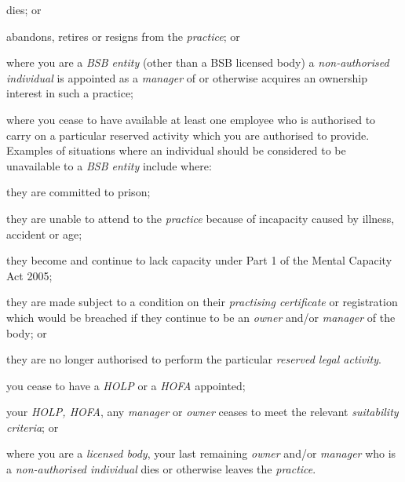 \al\item dies; or

\item abandons, retires or resigns from the \emph{practice}; or\la
\item where you are a \emph{BSB entity} (other than a BSB licensed body) a
\emph{non-authorised individual} is appointed as a \emph{manager} of or
otherwise acquires an ownership interest in such a practice;
\item where you cease to have available at least one employee who is
authorised to carry on a particular reserved activity which you are
authorised to provide. Examples of situations where an individual should
be considered to be unavailable to a \emph{BSB entity} include where:
\al
\item they are committed to prison;

\item they are unable to attend to the \emph{practice} because of
incapacity caused by illness, accident or age;

\item they become and continue to lack capacity under Part 1 of the Mental
Capacity Act 2005;

\item they are made subject to a condition on their \emph{practising
certificate} or registration which would be breached if they continue to
be an \emph{owner} and/or \emph{manager} of the body; or

\item they are no longer authorised to perform the particular
\emph{reserved legal activity}.\la
\item you cease to have a \emph{HOLP} or a \emph{HOFA} appointed;
\item your \emph{HOLP, HOFA}, any \emph{manager} or \emph{owner} ceases to
meet the relevant \emph{suitability criteria}; or
\item where you are a \emph{licensed body}, your last remaining
\emph{owner} and/or \emph{manager} who is a \emph{non-authorised
individual} dies or otherwise leaves the \emph{practice}.
\ln
{}

